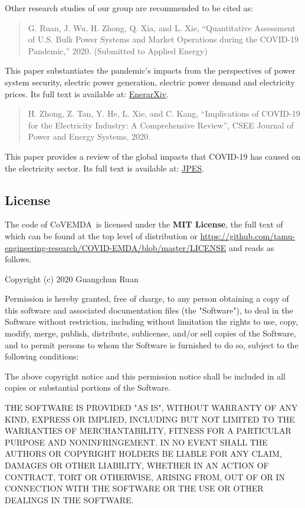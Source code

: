 \documentclass[11pt]{article}
\newcommand{\covemda}{CoVEMDA}
\numberwithin{equation}{section}
\numberwithin{table}{section}
\numberwithin{figure}{section}
\begin{document}
Other research studies of our group are recommended to be cited as:

\begin{quotation}\footnotesize
G. Ruan, J. Wu, H. Zhong, Q. Xia, and L. Xie, ``Quantitative Assessment of U.S. Bulk Power Systems and Market Operations during the COVID-19 Pandemic,'' 2020. (Submitted to Applied Energy)
\end{quotation}

This paper substantiates the pandemic's impacts from the perspectives of power system security, electric power generation, electric power demand and electricity prices. Its full text is available at: \href{http://www.enerarxiv.org/page/thesis.html?id=2196}{EnerarXiv}.

\begin{quotation}\footnotesize
H. Zhong, Z. Tan, Y. He, L. Xie, and C. Kang, ``Implications of COVID-19 for the Electricity Industry: A Comprehensive Review'', CSEE Journal of Power and Energy Systems, 2020.
\end{quotation}

This paper provides a review of the global impacts that COVID-19 has caused on the electricity sector. Its full text is available at: \href{https://ieeexplore.ieee.org/abstract/document/9160443}{JPES}.

\subsection{License}
The code of \covemda~is licensed under the \textbf{MIT License}, the full text of which can be found at the top level of distribution or \url{https://github.com/tamu-engineering-research/COVID-EMDA/blob/master/LICENSE} and reads as follows.
\begin{Notice}
Copyright (c) 2020 Guangchun Ruan

Permission is hereby granted, free of charge, to any person obtaining a copy
of this software and associated documentation files (the "Software"), to deal
in the Software without restriction, including without limitation the rights
to use, copy, modify, merge, publish, distribute, sublicense, and/or sell
copies of the Software, and to permit persons to whom the Software is
furnished to do so, subject to the following conditions:

The above copyright notice and this permission notice shall be included in all
copies or substantial portions of the Software.

THE SOFTWARE IS PROVIDED "AS IS", WITHOUT WARRANTY OF ANY KIND, EXPRESS OR
IMPLIED, INCLUDING BUT NOT LIMITED TO THE WARRANTIES OF MERCHANTABILITY,
FITNESS FOR A PARTICULAR PURPOSE AND NONINFRINGEMENT. IN NO EVENT SHALL THE
AUTHORS OR COPYRIGHT HOLDERS BE LIABLE FOR ANY CLAIM, DAMAGES OR OTHER
LIABILITY, WHETHER IN AN ACTION OF CONTRACT, TORT OR OTHERWISE, ARISING FROM,
OUT OF OR IN CONNECTION WITH THE SOFTWARE OR THE USE OR OTHER DEALINGS IN THE
SOFTWARE.
\end{Notice}
\end{document}
